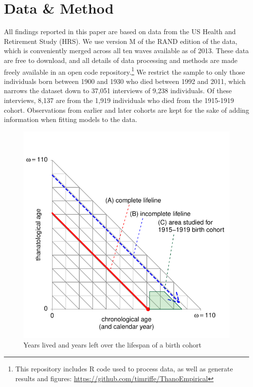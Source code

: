 \documentclass[11pt,oneside]{article} %
\begin{document}
\section*{Data \& Method}

All findings reported in this paper are based on data from the US Health and
Retirement Study (HRS). We use version M of the RAND edition of the data, which
is conveniently merged across all ten waves available as of 2013.
These data are free to download, and all details of data processing and methods are made freely available in an open code
repository.\footnote{This
repository includes R code used to process data, as well as generate results and
figures: \url{https://github.com/timriffe/ThanoEmpirical}}
We restrict the sample to only those
individuals born between 1900 and 1930 who died between 1992 and 2011, which
narrows the dataset down to 37,051 interviews of 9,238 individuals. Of
these interviews, 8,137 are from the 1,919 individuals who died from the
1915-1919 cohort. Observations from earlier and later cohorts are kept for the
sake of adding information when fitting models to the data.
%
\begin{figure}[!h]
\centering
\caption{Years lived and years left over the lifespan of a birth cohort}
\label{fig:LexisOrtho}
	\includegraphics{Figures/LexisOrtho.pdf}
\end{figure}
\end{document}
